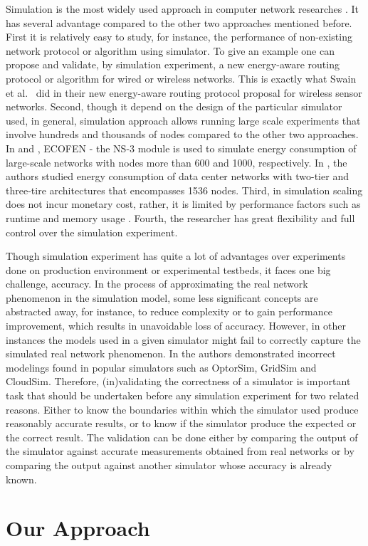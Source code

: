 Simulation is the most widely used approach in computer network researches \cite{DBLP:conf/icc/WeingartnerLW09}. It has several advantage compared to the other two approaches mentioned before. First it is relatively easy to study, for instance, the performance of non-existing network protocol or algorithm using simulator. To give an example one can propose and validate, by simulation experiment, a new energy-aware routing protocol or algorithm for wired or wireless networks. This is exactly what Swain et al.{\ }\cite{DBLP:conf/aina/SwainHC10} did in their new energy-aware routing protocol proposal for wireless sensor networks. Second, though it depend on the design of the particular simulator used, in general, simulation approach allows running large scale experiments that involve hundreds and thousands of nodes compared to the other two approaches. In \cite{DBLP:conf/valuetools/CarneiroFR09} and \cite{DBLP:conf/cloudnet/CorneaOL14}, ECOFEN - the NS-3 module is used to simulate energy consumption of large-scale networks with nodes more than 600 and 1000, respectively. In \cite{DBLP:journals/tjs/KliazovichBK12}, the authors studied energy consumption of data center networks with two-tier and three-tire architectures that encompasses 1536 nodes. Third, in simulation scaling does not incur monetary cost, rather, it is limited by performance factors such as runtime and memory usage \cite{DBLP:conf/icc/WeingartnerLW09}. Fourth, the researcher has great flexibility and full control over the simulation experiment. 

Though simulation experiment has quite a lot of advantages over experiments done on production environment or experimental testbeds, it faces one big challenge, accuracy. In the process of approximating the real network phenomenon in the simulation model, some less significant concepts are abstracted away, for instance, to reduce complexity or to gain performance improvement, which results in unavoidable loss of accuracy. However, in other instances the models used in a given simulator might fail to correctly capture the simulated real network phenomenon. In \cite{DBLP:journals/tomacs/VelhoSCL13} the authors demonstrated incorrect modelings found in popular simulators such as OptorSim, GridSim and CloudSim. Therefore, (in)validating the correctness of a simulator is important task that should be undertaken before any simulation experiment for two related reasons. Either to know the boundaries within which the simulator used produce reasonably accurate results, or to know if the simulator produce the expected or the correct result. The validation can be done either by comparing the output of the simulator against accurate measurements obtained from real networks or by comparing the output against another simulator whose accuracy is already known\cite{DBLP:books/daglib/0076234}.
\section{Our Approach}
\label{section:ourapproach}

